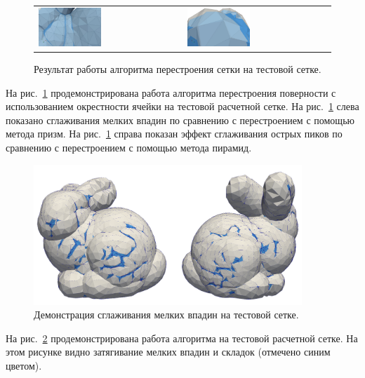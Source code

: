 \begin{figure}[ht]
\centering
\begin{tabular}{ll}
\includegraphics[width=0.45\textwidth]{./pics/text_1_remesh_common_envelope/pic_envelope_cave.png}
&
\includegraphics[width=0.45\textwidth]{./pics/text_1_remesh_common_envelope/pic_envelope_peak.png}
\end{tabular}
\singlespacing
{}\caption{Результат работы алгоритма перестроения сетки на тестовой сетке.}
\label{fig:text_1_remesh3_common_envelope_bunny}
\end{figure}

На рис.~\ref{fig:text_1_remesh3_common_envelope_bunny} продемонстрирована работа алгоритма перестроения поверности с использованием окрестности ячейки на тестовой расчетной сетке.
На рис.~\ref{fig:text_1_remesh3_common_envelope_bunny} слева показано сглаживания мелких впадин по сравнению с перестроением с помощью метода призм.
На рис.~\ref{fig:text_1_remesh3_common_envelope_bunny} справа показан эффект сглаживания острых пиков по сравнению с перестроением с помощью метода пирамид\label{term:method_remesh_pyramid2}.

\begin{figure}[ht]
\centering
\includegraphics[width=0.9\textwidth]{./pics/text_1_remesh_common_envelope/bunny.png}
\singlespacing
{}\caption{Демонстрация сглаживания мелких впадин на тестовой сетке.}
\label{fig:text_1_remesh3_common_envelope_bunny2}
\end{figure}

На рис.~\ref{fig:text_1_remesh3_common_envelope_bunny2} продемонстрирована работа алгоритма на тестовой расчетной сетке.
На этом рисунке видно затягивание мелких впадин и складок (отмечено синим цветом).